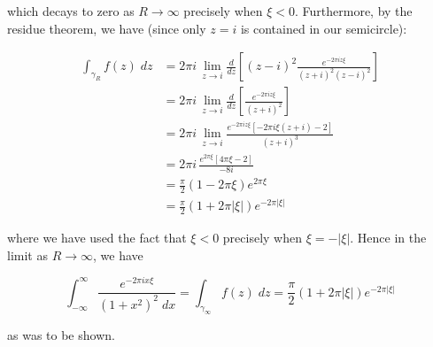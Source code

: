 \begin{solution}
  which decays to zero as $R \to \infty$ precisely when $\xi < 0$. Furthermore, by the residue theorem, we have (since 
  only $z = i$ is contained in our semicircle):

  \begin{align*}
    \int_{\gamma_R} { f(z) \; dz } &= 2 \pi i \, \lim\limits_{z \to i} \frac{d}{dz} \left[ (z - i)^2 \frac{e^{-2 \pi i z \xi}}{(z+i)^2 (z - i)^2} \right] \\
                                   &= 2 \pi i \, \lim\limits_{z \to i} \frac{d}{dz} \left[ \frac{e^{-2 \pi i z \xi}}{(z+i)^2} \right] \\
                                   &= 2 \pi i \, \lim\limits_{z \to i} \frac{e^{-2 \pi i z \xi} \left[ -2 \pi i \xi (z + i) - 2 \right]}{(z+i)^3} \\
                                   &= 2 \pi i \, \frac{e^{2 \pi \xi} \left[ 4 \pi \xi - 2 \right]}{-8i} \\
                                   &= \frac{\pi}{2} (1 - 2 \pi \xi) e^{2 \pi \xi} \\
                                   &= \frac{\pi}{2} (1 + 2 \pi |\xi|) e^{-2 \pi |\xi|}
  \end{align*}

  where we have used the fact that $\xi < 0$ precisely when $\xi = -|\xi|$. Hence in the limit as $R \to \infty$, we 
  have

  $$
    \int_{-\infty}^{\infty} \frac{e^{-2 \pi i x \xi}}{\left(1 + x^2\right)^2 \; dx } 
      = \int_{\gamma_{\infty}} { f(z) \; dz } 
      = \frac{\pi}{2} (1 + 2 \pi |\xi|) e^{-2 \pi |\xi|}
  $$

  as was to be shown.
  \ \\
\end{solution}